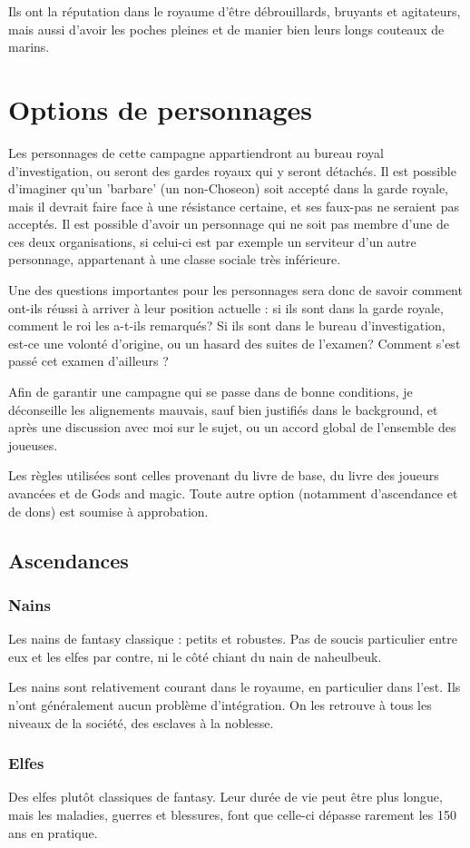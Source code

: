\documentclass[10pt,a4paper]{book}
\newcommand{\nomroyaume}{Choseon}
\begin{document}
Ils ont la réputation dans le royaume d'être débrouillards, bruyants et agitateurs, mais aussi d'avoir les poches pleines et de manier bien leurs longs couteaux de marins.
\chapter{Options de personnages}
Les personnages de cette campagne appartiendront au bureau royal d'investigation, ou seront des gardes royaux qui y seront détachés. Il est possible d'imaginer qu'un 'barbare' (un non-\nomroyaume) soit accepté dans la garde royale, mais il devrait faire face à une résistance certaine, et ses faux-pas ne seraient pas acceptés. Il est possible d'avoir un personnage qui ne soit pas membre d'une de ces deux organisations, si celui-ci est par exemple un serviteur d'un autre personnage, appartenant à une classe sociale très inférieure.

Une des questions importantes pour les personnages sera donc de savoir comment ont-ils réussi à arriver à leur position actuelle : si ils sont dans la garde royale, comment le roi les a-t-ils remarqués? Si ils sont dans le bureau d'investigation, est-ce une volonté d'origine, ou un hasard des suites de l'examen? Comment s'est passé cet examen d'ailleurs ?

Afin de garantir une campagne qui se passe dans de bonne conditions, je déconseille les alignements mauvais, sauf bien justifiés dans le background, et après une discussion avec moi sur le sujet, ou un accord global de l'ensemble des joueuses.

Les règles utilisées sont celles provenant du livre de base, du livre des joueurs avancées et de Gods and magic. Toute autre option (notamment d'ascendance et de dons) est soumise à approbation.
\section{Ascendances}
\subsection{Nains}
Les nains de fantasy classique : petits et robustes. Pas de soucis particulier entre eux et les elfes par contre, ni le côté chiant du nain de naheulbeuk.

Les nains sont relativement courant dans le royaume, en particulier dans l'est. Ils n'ont généralement aucun problème d'intégration. On les retrouve à tous les niveaux de la société, des esclaves à la noblesse.
\subsection{Elfes}
Des elfes plutôt classiques de fantasy. Leur durée de vie peut être plus longue, mais les maladies, guerres et blessures, font que celle-ci dépasse rarement les 150 ans en pratique.
\end{document}
